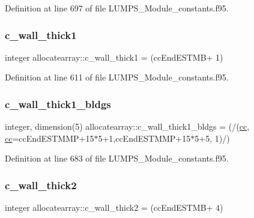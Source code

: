 Definition at line 697 of file L\+U\+M\+P\+S\+\_\+\+Module\+\_\+constants.\+f95.

\mbox{\label{namespaceallocatearray_a9fa538a9bf9934baec62b04d2254711b}} 
\subsubsection{\texorpdfstring{c\+\_\+wall\+\_\+thick1}{c\_wall\_thick1}}
{\footnotesize\ttfamily integer allocatearray\+::c\+\_\+wall\+\_\+thick1 = (cc\+End\+E\+S\+T\+MB+ 1)}



Definition at line 611 of file L\+U\+M\+P\+S\+\_\+\+Module\+\_\+constants.\+f95.

\mbox{\label{namespaceallocatearray_a1061e11bf9a6d6a6a63b9388a8a43270}} 
\subsubsection{\texorpdfstring{c\+\_\+wall\+\_\+thick1\+\_\+bldgs}{c\_wall\_thick1\_bldgs}}
{\footnotesize\ttfamily integer, dimension(5) allocatearray\+::c\+\_\+wall\+\_\+thick1\+\_\+bldgs = (/(\hyperlink{namespaceallocatearray_ac863c81704eb507dee10f5e10741e10c}{cc}, \hyperlink{namespaceallocatearray_ac863c81704eb507dee10f5e10741e10c}{cc}=cc\+End\+E\+S\+T\+M\+MP+15$\ast$5+1,cc\+End\+E\+S\+T\+M\+MP+15$\ast$5+5, 1)/)}



Definition at line 683 of file L\+U\+M\+P\+S\+\_\+\+Module\+\_\+constants.\+f95.

\mbox{\label{namespaceallocatearray_a20f484b05dbdface58628f54a4c31343}} 
\subsubsection{\texorpdfstring{c\+\_\+wall\+\_\+thick2}{c\_wall\_thick2}}
{\footnotesize\ttfamily integer allocatearray\+::c\+\_\+wall\+\_\+thick2 = (cc\+End\+E\+S\+T\+MB+ 4)}




